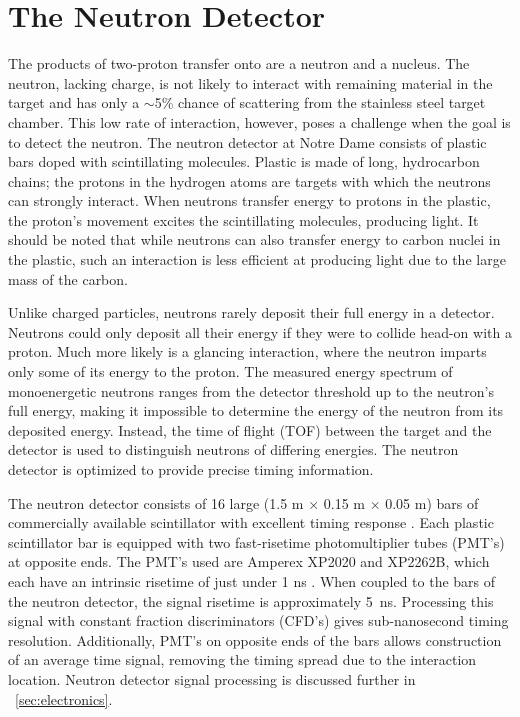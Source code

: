 \section{The Neutron Detector}
\label{sec:detector}

The products of two-proton transfer onto \GeTargets are a neutron and a \SeProducts nucleus.  The neutron, lacking charge, is not likely to interact with remaining material in the target and has only a $\sim$5\% chance of scattering from the stainless steel target chamber.  This low rate of interaction, however, poses a challenge when the goal is to detect the neutron.  The neutron detector at Notre Dame consists of plastic bars doped with scintillating molecules.  Plastic is made of long, hydrocarbon chains; the protons in the hydrogen atoms are targets with which the neutrons can strongly interact.  When neutrons transfer energy to protons in the plastic, the proton's movement excites the scintillating molecules, producing light.  It should be noted that while neutrons can also transfer energy to carbon nuclei in the plastic, such an interaction is less efficient at producing light due to the large mass of the carbon.  

Unlike charged particles, neutrons rarely deposit their full energy in a detector.  Neutrons could only deposit all their energy if they were to collide head-on with a proton.  Much more likely is a glancing interaction, where the neutron imparts only some of its energy to the proton.  The measured energy spectrum of monoenergetic neutrons ranges from the detector threshold up to the neutron's full energy, making it impossible to determine the energy of the neutron from its deposited energy.  Instead, the time of flight (TOF) between the target and the detector is used to distinguish neutrons of differing energies.  The neutron detector is optimized to provide precise timing information.       

The neutron detector \citep{KolataNeutwall} consists of 16 large (1.5 m $\times$ 0.15 m $\times$ 0.05 m) bars of commercially available scintillator with excellent timing response \citep{BC408}.  Each plastic scintillator bar is equipped with two fast-risetime photomultiplier tubes (PMT's) at opposite ends.  The PMT's used are Amperex XP2020 and XP2262B, which each have an intrinsic risetime of just under 1 ns \citep{PMT_XP2020,KolataNeutwall}.   When coupled to the bars of the neutron detector, the signal risetime is approximately 5~ns.  Processing this signal with constant fraction discriminators (CFD's) gives sub-nanosecond timing resolution.  Additionally, PMT's on opposite ends of the bars allows construction of an average time signal, removing the timing spread due to the interaction location.  Neutron detector signal processing is discussed further in {\sect}~\ref{sec:electronics}.

